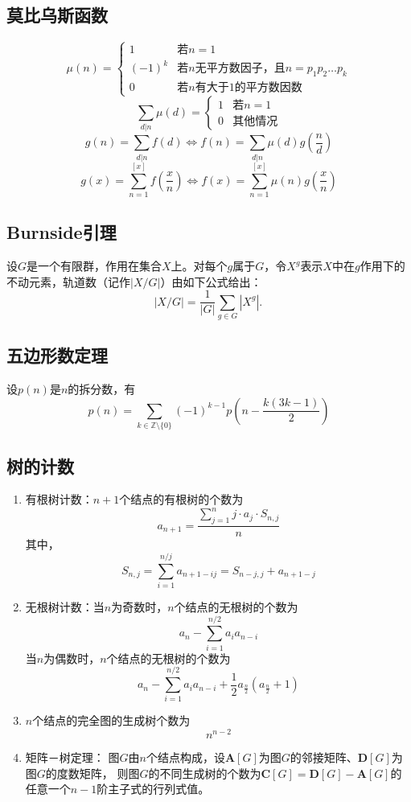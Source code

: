 	\subsection{莫比乌斯函数}
		$$\mu(n) = \begin{cases}
			1 & \text{若}n=1\\
			(-1)^k & \text{若}n\text{无平方数因子，且}n = p_1p_2\dots p_k\\
			0 & \text{若}n\text{有大于}1\text{的平方数因数}
		\end{cases}$$
		$$\sum_{d|n}{\mu(d)} = \begin{cases}
			1 & \text{若}n=1\\
			0 & \text{其他情况}
		\end{cases}$$
		$$g(n) = \sum_{d|n}{f(d)} \Leftrightarrow f(n) = \sum_{d|n}{\mu(d)g(\frac{n}{d})}$$
		$$g(x) = \sum_{n=1}^{[x]}f(\frac{x}{n}) \Leftrightarrow f(x) = \sum_{n=1}^{[x]}{\mu(n)g(\frac{x}{n})}$$
	\subsection{Burnside引理}
		设$G$是一个有限群，作用在集合$X$上。对每个$g$属于$G$，令$X^g$表示$X$中在$g$作用下的不动元素，轨道数（记作$|X/G|$）由如下公式给出：
			$$|X/G| = \frac{1}{|G|}\sum_{g \in G}|X^g|.\,$$
	\subsection{五边形数定理}
		设$p(n)$是$n$的拆分数，有$$p(n) = \sum_{k \in \mathbb{Z} \setminus \{0\}} (-1)^{k - 1} p\left(n - \frac{k(3k - 1)}{2}\right)$$
	\subsection{树的计数}
		\begin{enumerate}
			\item 有根树计数：$n+1$个结点的有根树的个数为
				$$a_{n+1} = \frac{\sum_{j=1}^{n}{j \cdot a_j \cdot{S_{n, j}}}}{n}$$
			其中，
				$$S_{n, j} = \sum_{i=1}^{n/j}{a_{n+1-ij}} = S_{n-j, j} + a_{n+1-j}$$
			\item 无根树计数：当$n$为奇数时，$n$个结点的无根树的个数为
				$$a_n-\sum_{i=1}^{n/2}{a_ia_{n-i}}$$
			当$n$为偶数时，$n$个结点的无根树的个数为
				$$a_n-\sum_{i=1}^{n/2}{a_ia_{n-i}}+\frac{1}{2}a_{\frac{n}{2}}(a_{\frac{n}{2}}+1)$$
			\item $n$个结点的完全图的生成树个数为
				$$n^{n-2}$$
			\item 矩阵－树定理：
			图$G$由$n$个结点构成，设$\bm{A}[G]$为图$G$的邻接矩阵、$\bm{D}[G]$为图$G$的度数矩阵，
			则图$G$的不同生成树的个数为$\bm{C}[G] = \bm{D}[G] - \bm{A}[G]$的任意一个$n-1$阶主子式的行列式值。
		\end{enumerate}
